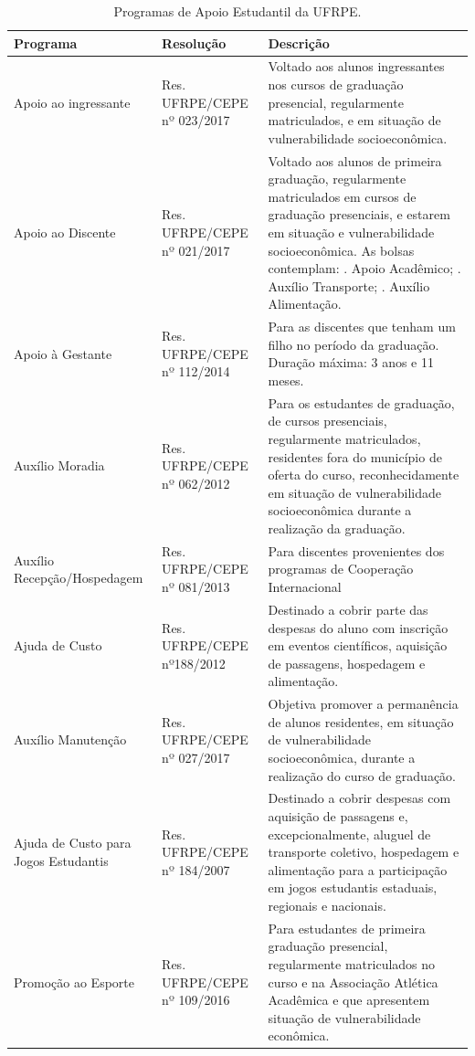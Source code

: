 \documentclass[
	12pt,				%
	openright,			%
  oneside,     %
	a4paper,			%
 hyphens,
	chapter=TITLE,		%
	english,			%
	french,				%
	spanish,			%
	brazil				%
	]{abntex2}
\begin{document}
\begin{center}
  \begin{scriptsize}
    \begin{longtable}{p{3.2cm}p{3cm}p{8cm}}
      \caption{\label{quadro:programas-apoio-estudantil-ufrpe}Programas de Apoio Estudantil da UFRPE.} \\
      \toprule
      \textbf{Programa} & \textbf{Resolução} & \textbf{Descrição}\\ \midrule
      Apoio ao ingressante & Res. UFRPE/CEPE nº 023/2017 & Voltado aos alunos ingressantes nos cursos de graduação presencial, regularmente matriculados, e em situação de vulnerabilidade socioeconômica.\\ \midrule
      Apoio ao Discente & Res. UFRPE/CEPE nº 021/2017 & Voltado aos alunos de primeira graduação, regularmente matriculados em cursos de graduação presenciais, e estarem em situação e vulnerabilidade socioeconômica. As bolsas contemplam: \newline
      1. Apoio Acadêmico; \newline
      2. Auxílio Transporte; \newline
      3. Auxílio Alimentação. \\ \midrule
      Apoio à Gestante & Res. UFRPE/CEPE nº 112/2014 & Para as discentes que tenham um filho no período da graduação. Duração máxima: 3 anos e 11 meses. \\ \midrule
      Auxílio Moradia & Res. UFRPE/CEPE nº 062/2012 & Para os estudantes de graduação, de cursos presenciais, regularmente matriculados, residentes fora do município de oferta do curso, reconhecidamente em situação de vulnerabilidade socioeconômica durante a realização da graduação. \\ \midrule
      Auxílio \newline Recepção/Hospedagem & Res. UFRPE/CEPE nº 081/2013 & Para discentes provenientes dos programas de Cooperação Internacional \\ \midrule
      Ajuda de Custo & Res. UFRPE/CEPE nº188/2012 & Destinado a cobrir parte das despesas do aluno com inscrição em eventos científicos, aquisição de passagens, hospedagem e alimentação. \\ \midrule
      Auxílio Manutenção & Res. UFRPE/CEPE nº 027/2017 & Objetiva promover a permanência de alunos residentes, em situação de vulnerabilidade socioeconômica, durante a realização do curso de graduação. \\ \midrule
      Ajuda de Custo para Jogos Estudantis & Res. UFRPE/CEPE nº 184/2007 & Destinado a cobrir despesas com aquisição de passagens e, excepcionalmente, aluguel de transporte coletivo, hospedagem e alimentação para a participação em jogos estudantis estaduais, regionais e nacionais.\\ \midrule
      Promoção ao Esporte & Res. UFRPE/CEPE nº 109/2016 & Para estudantes de primeira graduação presencial, regularmente matriculados no curso e na Associação Atlética Acadêmica e que apresentem situação de vulnerabilidade econômica.\\
    \bottomrule
\end{longtable}
\end{scriptsize}
\end{center}
\end{document}
